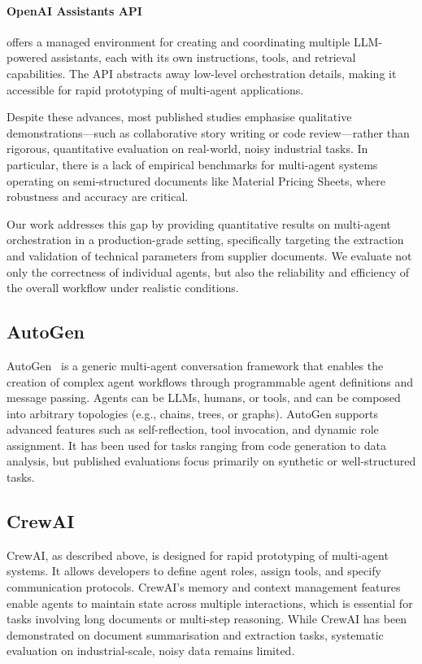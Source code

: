 \paragraph{OpenAI Assistants API} offers a managed environment for creating and coordinating multiple LLM-powered assistants, each with its own instructions, tools, and retrieval capabilities. The API abstracts away low-level orchestration details, making it accessible for rapid prototyping of multi-agent applications.

Despite these advances, most published studies emphasise qualitative demonstrations—such as collaborative story writing or code review—rather than rigorous, quantitative evaluation on real-world, noisy industrial tasks. In particular, there is a lack of empirical benchmarks for multi-agent systems operating on semi-structured documents like Material Pricing Sheets, where robustness and accuracy are critical.

Our work addresses this gap by providing quantitative results on multi-agent orchestration in a production-grade setting, specifically targeting the extraction and validation of technical parameters from supplier documents. We evaluate not only the correctness of individual agents, but also the reliability and efficiency of the overall workflow under realistic conditions.

\subsection{AutoGen}
AutoGen~\cite{wu2023autogen} is a generic multi-agent conversation framework that enables the creation of complex agent workflows through programmable agent definitions and message passing. Agents can be LLMs, humans, or tools, and can be composed into arbitrary topologies (e.g., chains, trees, or graphs). AutoGen supports advanced features such as self-reflection, tool invocation, and dynamic role assignment. It has been used for tasks ranging from code generation to data analysis, but published evaluations focus primarily on synthetic or well-structured tasks.

\subsection{CrewAI}
CrewAI, as described above, is designed for rapid prototyping of multi-agent systems. It allows developers to define agent roles, assign tools, and specify communication protocols. CrewAI's memory and context management features enable agents to maintain state across multiple interactions, which is essential for tasks involving long documents or multi-step reasoning. While CrewAI has been demonstrated on document summarisation and extraction tasks, systematic evaluation on industrial-scale, noisy data remains limited.

